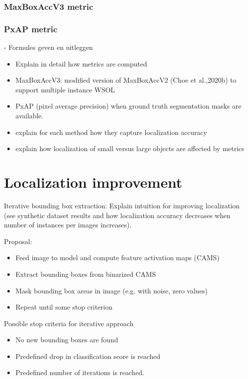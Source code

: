 \subsubsection{MaxBoxAccV3 metric}
\subsubsection{PxAP metric}

- Formules geven en uitleggen \\
\begin{itemize}
    \item Explain in detail how metrics are computed
    \item MaxBoxAccV3: modified version of MaxBoxAccV2 (Choe et al.,2020b) to support multiple instance WSOL
    \item PxAP (pixel average precision) when ground truth segmentation masks are available.
    \item explain for each method how they capture localization accuracy
    \item explain how localization of small versus large objects are affected by metrics
\end{itemize}

\section{Localization improvement}
Iterative bounding box extraction: Explain intuition for improving localization (see synthetic dataset results and how localization accuracy decreases when number of instances per images increases).

Proposal:
\begin{itemize}
    \item Feed image to model and compute feature activation maps (CAMS)
    \item Extract bounding boxes from binarized CAMS
    \item Mask bounding box areas in image (e.g. with noise, zero values)
    \item Repeat until some stop criterion
\end{itemize}

Possible stop criteria for iterative approach
\begin{itemize}
    \item No new bounding boxes are found
    \item Predefined drop in classification score is reached
    \item Predefined number of iterations is reached.
\end{itemize}

